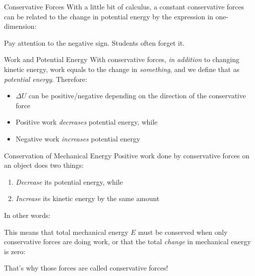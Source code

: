 \documentclass[12pt,compress,aspectratio=169]{beamer}
\begin{document}
\begin{frame}{Conservative Forces}
  With a little bit of calculus, a constant conservative forces can be related
  to the change in potential energy by the expression in one-dimension:


  Pay attention to the negative sign. Students often forget it.
\end{frame}




\begin{frame}{Work and Potential Energy}
  With conservative forces, \emph{in addition} to changing kinetic energy,
  work equals to the change in \emph{something}, and we define that
  as \emph{potential energy}. Therefore:

  \begin{itemize}
  \item\vspace{-.15in}$\Delta U$ can be positive/negative depending on the
    direction of the conservative force
  \item Positive work \emph{decreases} potential energy, while
  \item Negative work \emph{increases} potential energy
  \end{itemize}
\end{frame}



\begin{frame}{Conservation of Mechanical Energy}
  Positive work done by conservative forces on an object does two things:
  \begin{enumerate}[1.]
  \item\emph{Decrease} its potential energy, while
  \item\emph{Increase} its kinetic energy by the same amount
  \end{enumerate}
  In other words:


  \vspace{-.15in}This means that total mechanical energy $E$ must be conserved
  when only conservative forces are doing work, or that the total \emph{change}
  in mechanical energy is zero:
  

  \vspace{-.15in}That's why those forces are called conservative forces!
\end{frame}
\end{document}

